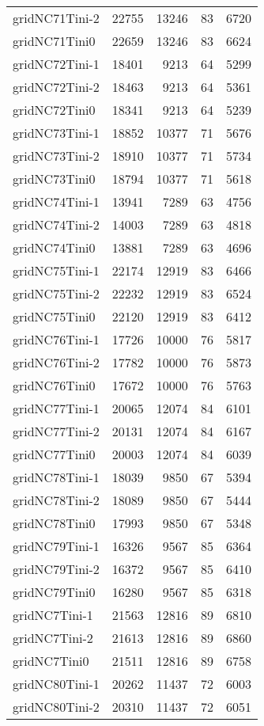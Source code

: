 \documentclass[../../../thesis.tex]{subfiles}
\begin{document}
\begin{longtable}{lrrrr}
gridNC71Tini-2 & 22755 & 13246 & 83 & 6720 \\
gridNC71Tini0 & 22659 & 13246 & 83 & 6624 \\
gridNC72Tini-1 & 18401 & 9213 & 64 & 5299 \\
gridNC72Tini-2 & 18463 & 9213 & 64 & 5361 \\
gridNC72Tini0 & 18341 & 9213 & 64 & 5239 \\
gridNC73Tini-1 & 18852 & 10377 & 71 & 5676 \\
gridNC73Tini-2 & 18910 & 10377 & 71 & 5734 \\
gridNC73Tini0 & 18794 & 10377 & 71 & 5618 \\
gridNC74Tini-1 & 13941 & 7289 & 63 & 4756 \\
gridNC74Tini-2 & 14003 & 7289 & 63 & 4818 \\
gridNC74Tini0 & 13881 & 7289 & 63 & 4696 \\
gridNC75Tini-1 & 22174 & 12919 & 83 & 6466 \\
gridNC75Tini-2 & 22232 & 12919 & 83 & 6524 \\
gridNC75Tini0 & 22120 & 12919 & 83 & 6412 \\
gridNC76Tini-1 & 17726 & 10000 & 76 & 5817 \\
gridNC76Tini-2 & 17782 & 10000 & 76 & 5873 \\
gridNC76Tini0 & 17672 & 10000 & 76 & 5763 \\
gridNC77Tini-1 & 20065 & 12074 & 84 & 6101 \\
gridNC77Tini-2 & 20131 & 12074 & 84 & 6167 \\
gridNC77Tini0 & 20003 & 12074 & 84 & 6039 \\
gridNC78Tini-1 & 18039 & 9850 & 67 & 5394 \\
gridNC78Tini-2 & 18089 & 9850 & 67 & 5444 \\
gridNC78Tini0 & 17993 & 9850 & 67 & 5348 \\
gridNC79Tini-1 & 16326 & 9567 & 85 & 6364 \\
gridNC79Tini-2 & 16372 & 9567 & 85 & 6410 \\
gridNC79Tini0 & 16280 & 9567 & 85 & 6318 \\
gridNC7Tini-1 & 21563 & 12816 & 89 & 6810 \\
gridNC7Tini-2 & 21613 & 12816 & 89 & 6860 \\
gridNC7Tini0 & 21511 & 12816 & 89 & 6758 \\
gridNC80Tini-1 & 20262 & 11437 & 72 & 6003 \\
gridNC80Tini-2 & 20310 & 11437 & 72 & 6051 \\

\end{longtable}
\end{document}
